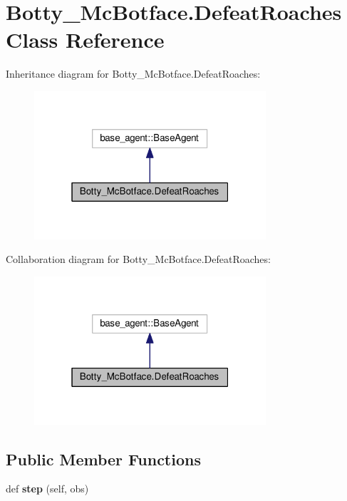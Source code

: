 \hypertarget{classBotty__McBotface_1_1DefeatRoaches}{}\section{Botty\+\_\+\+Mc\+Botface.\+Defeat\+Roaches Class Reference}
\label{classBotty__McBotface_1_1DefeatRoaches}


Inheritance diagram for Botty\+\_\+\+Mc\+Botface.\+Defeat\+Roaches\+:
\nopagebreak
\begin{figure}[H]
\begin{center}
\leavevmode
\includegraphics[width=244pt]{classBotty__McBotface_1_1DefeatRoaches__inherit__graph}
\end{center}
\end{figure}


Collaboration diagram for Botty\+\_\+\+Mc\+Botface.\+Defeat\+Roaches\+:
\nopagebreak
\begin{figure}[H]
\begin{center}
\leavevmode
\includegraphics[width=244pt]{classBotty__McBotface_1_1DefeatRoaches__coll__graph}
\end{center}
\end{figure}
\subsection*{Public Member Functions}
\begin{DoxyCompactItemize}
\item 
def {\bfseries step} (self, obs)\hypertarget{classBotty__McBotface_1_1DefeatRoaches_ab59843f6730063c2e48834e6edf8ccf3}{}\label{classBotty__McBotface_1_1DefeatRoaches_ab59843f6730063c2e48834e6edf8ccf3}

\end{DoxyCompactItemize}



